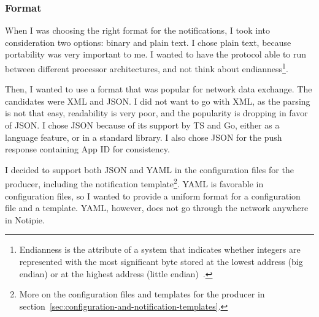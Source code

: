 \subsubsection{Format}\label{sec:protocol-format}

When I was choosing the right format
for the notifications,
I took into consideration two options:
binary and plain text.
I chose plain text,
because portability was very important to me.
I wanted to have the protocol able to run
between different processor architectures,
and not think about endianness\footnote{
  Endianness is the attribute of a system
  that indicates whether integers are represented with
  the most significant byte
  stored at the lowest address (big endian)
  or at the highest address (little endian)~\cite{adiga_how_2007}.
}.

Then, I wanted to use a format
that was popular for network data exchange.
The candidates were \ac{XML} and \ac{JSON}.
I did not want to go with \ac{XML},
as the parsing is not that easy,
readability is very poor,
and the popularity is dropping
in favor of \ac{JSON}.
I chose \ac{JSON}
because of its support by \ac{TS} and Go,
either as a language feature,
or in a standard library.
I also chose \ac{JSON} for the push response
containing App \ac{ID}
for consistency.

I decided to support both \ac{JSON} and \ac{YAML}
in the configuration files for the producer,
including the notification template\footnote{
  More on the configuration files and templates
  for the producer
  in section~\ref{sec:configuration-and-notification-templates}.
}.
\ac{YAML} is favorable in configuration files,
so I wanted to provide a uniform
format for a configuration file
and a template.
\ac{YAML}, however,
does not go through the network
anywhere in Notipie.
